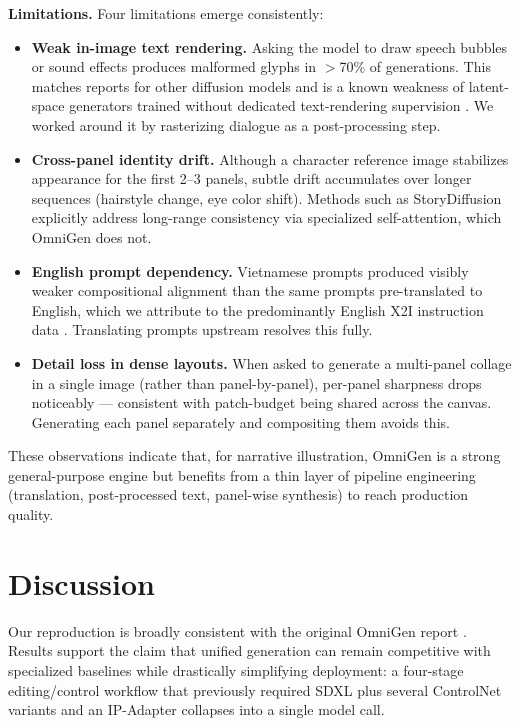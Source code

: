 \documentclass[conference]{IEEEtran}
\begin{document}
\textbf{Limitations.} Four limitations emerge consistently:
\begin{itemize}
    \item \textbf{Weak in-image text rendering.} Asking the model to draw speech bubbles or sound effects produces malformed glyphs in $>$70\% of generations. This matches reports for other diffusion models and is a known weakness of latent-space generators trained without dedicated text-rendering supervision \cite{rombach2022high,sd3}. We worked around it by rasterizing dialogue as a post-processing step.
    \item \textbf{Cross-panel identity drift.} Although a character reference image stabilizes appearance for the first 2--3 panels, subtle drift accumulates over longer sequences (hairstyle change, eye color shift). Methods such as StoryDiffusion \cite{storydiffusion} explicitly address long-range consistency via specialized self-attention, which OmniGen does not.
    \item \textbf{English prompt dependency.} Vietnamese prompts produced visibly weaker compositional alignment than the same prompts pre-translated to English, which we attribute to the predominantly English X2I instruction data \cite{omnigen2024}. Translating prompts upstream resolves this fully.
    \item \textbf{Detail loss in dense layouts.} When asked to generate a multi-panel collage in a single image (rather than panel-by-panel), per-panel sharpness drops noticeably --- consistent with patch-budget being shared across the canvas. Generating each panel separately and compositing them avoids this.
\end{itemize}

These observations indicate that, for narrative illustration, OmniGen is a strong general-purpose engine but benefits from a thin layer of pipeline engineering (translation, post-processed text, panel-wise synthesis) to reach production quality.

\section{Discussion}
\label{sec:discussion}
Our reproduction is broadly consistent with the original OmniGen report \cite{omnigen2024}. Results support the claim that unified generation can remain competitive with specialized baselines while drastically simplifying deployment: a four-stage editing/control workflow that previously required SDXL plus several ControlNet variants \cite{controlnet} and an IP-Adapter \cite{ye2023ipadapter} collapses into a single model call.
\end{document}
